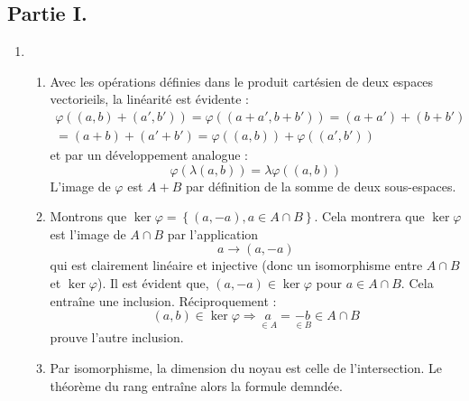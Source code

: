 \subsection*{Partie I.}
\begin{enumerate}
 \item \begin{enumerate}
 \item 
Avec les opérations définies dans le produit cartésien de deux espaces vectorieils, la linéarité est évidente :
\begin{multline*}
 \varphi((a,b)+(a',b'))=\varphi((a+a',b+b'))=(a+a')+(b+b')\\
=(a+b)+(a'+b') =\varphi((a,b))+\varphi((a',b'))
\end{multline*}
et par un développement analogue :
\begin{displaymath}
 \varphi(\lambda(a,b))=\lambda\varphi((a,b))
\end{displaymath}
L'image de $\varphi$ est $A+B$ par définition de la somme de deux sous-espaces.
\item Montrons que $\ker \varphi = \left\lbrace (a,-a), a\in A \cap B\right\rbrace $. Cela montrera que $\ker \varphi$ est l'image de $A\cap B$ par l'application
\begin{displaymath}
 a \rightarrow (a,-a)
\end{displaymath}
qui est clairement linéaire et injective (donc un isomorphisme entre $A\cap B$ et $\ker \varphi$).\newline
Il est évident que, $(a,-a)\in\ker \varphi$ pour $a\in A\cap B$. Cela entraîne une inclusion. Réciproquement :
\begin{displaymath}
 (a,b)\in\ker \varphi \Rightarrow \underset{\in A}{a}=\underset{\in B}{-b}\in A\cap B
\end{displaymath}
prouve l'autre inclusion.
\item Par isomorphisme, la dimension du noyau est celle de l'intersection. Le théorème du rang entraîne alors la formule demndée.
\end{enumerate}


\end{enumerate}
